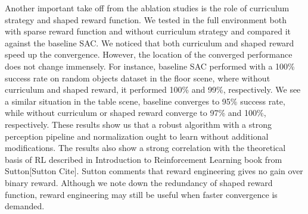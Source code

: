 Another important take off from the ablation studies is the role of curriculum strategy and shaped reward function. We tested in the full environment both with sparse reward function and without curriculum strategy and compared it against the baseline SAC. We noticed that both curriculum and shaped reward speed up the convergence. However, the location of the converged performance does not change immensely. For instance, baseline SAC performed with a 100\% success rate on random objects dataset in the floor scene, where without curriculum and shaped reward, it performed 100\% and 99\%, respectively. We see a similar situation in the table scene, baseline converges to 95\% success rate, while without curriculum or shaped reward converge to 97\% and 100\%, respectively. These results show us that a robust algorithm with a strong perception pipeline and normalization ought to learn without additional modifications. The results also show a strong correlation with the theoretical basis of RL described in Introduction to Reinforcement Learning book from Sutton[Sutton Cite]. Sutton comments that reward engineering gives no gain over binary reward. Although we note down the redundancy of shaped reward function, reward engineering may still be useful when faster convergence is demanded.






